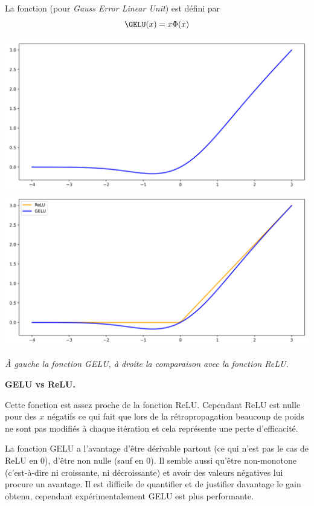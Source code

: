 \documentclass[11pt,class=report,crop=false]{standalone}
\begin{document}
La fonction  (pour \emph{Gauss Error Linear Unit}) est défini par 
$$\GELU(x) = x \Phi(x)$$


\begin{center}
	\includegraphics[scale=\myscale,scale=0.3]{figures/gelu03}\quad
	\includegraphics[scale=\myscale,scale=0.3]{figures/gelu04}
	
	\emph{À gauche la fonction GELU, à droite la comparaison avec la fonction ReLU.}	
\end{center}

\textbf{GELU vs ReLU.}

Cette fonction est assez proche de la fonction ReLU.
Cependant ReLU est nulle pour des $x$ négatifs ce qui fait que lors de la rétropropagation beaucoup de poids ne sont pas modifiés à chaque itération et cela représente une perte d'efficacité. 

La fonction GELU a l'avantage d'être dérivable partout (ce qui n'est pas le cas de ReLU en $0$), d'être non nulle (sauf en $0$). Il semble aussi qu'être non-monotone (c'est-à-dire ni croissante, ni décroissante) et avoir des valeurs négatives lui procure un avantage.
Il est difficile de quantifier et de justifier davantage le gain obtenu, cependant expérimentalement GELU est plus performante.
\end{document}
